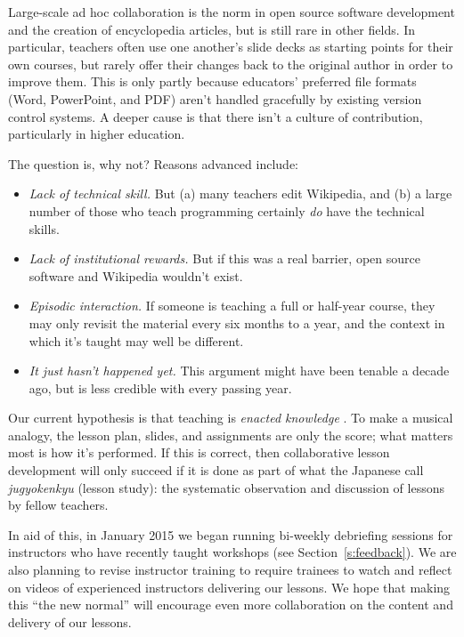 \documentclass[10pt,a4paper,twocolumn]{article}
\begin{document}
Large-scale ad hoc collaboration is the norm in open source software
development and the creation of encyclopedia articles, but is still
rare in other fields. In particular, teachers often use one another's
slide decks as starting points for their own courses, but rarely offer
their changes back to the original author in order to improve
them. This is only partly because educators' preferred file formats
(Word, PowerPoint, and PDF) aren't handled gracefully by existing
version control systems.  A deeper cause is that there isn't a culture
of contribution, particularly in higher education.

The question is, why not?  Reasons advanced include:

\begin{itemize}

\item \emph{Lack of technical skill.} But (a) many teachers edit
  Wikipedia, and (b) a large number of those who teach programming
  certainly \emph{do} have the technical skills.

\item \emph{Lack of institutional rewards.} But if this was a real
  barrier, open source software and Wikipedia wouldn't exist.

\item \emph{Episodic interaction.} If someone is teaching a full or
  half-year course, they may only revisit the material every six
  months to a year, and the context in which it's taught may well be
  different.

\item \emph{It just hasn't happened yet.} This argument might have
  been tenable a decade ago, but is less credible with every passing
  year.

\end{itemize}

Our current hypothesis is that teaching is \emph{enacted knowledge}
\cite{fincher2007,fincher2012}.
To make a musical analogy, the lesson plan, slides, and assignments
are only the score; what matters most is how it's performed.  If this
is correct, then collaborative lesson development will only succeed if
it is done as part of what the Japanese call \emph{jugyokenkyu}
(lesson study): the systematic observation and discussion of lessons
by fellow teachers.

In aid of this, in January 2015 we began running bi-weekly debriefing
sessions for instructors who have recently taught workshops (see
Section~\ref{s:feedback}).  We are also planning to revise instructor
training to require trainees to watch and reflect on videos of
experienced instructors delivering our lessons.  We hope that making
this ``the new normal'' will encourage even more collaboration on the
content and delivery of our lessons.
\end{document}
